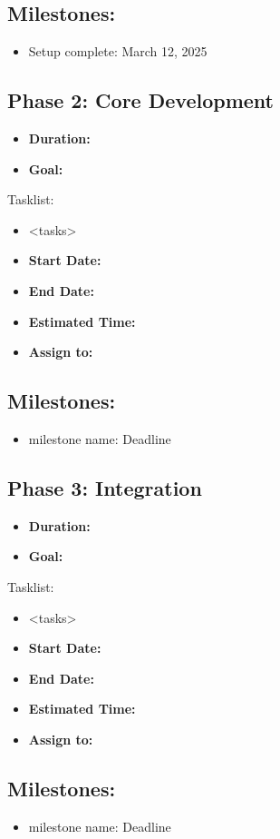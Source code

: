 \documentclass{report}
\begin{document}
\subsection*{Milestones:}
\begin{itemize}
    \item Setup complete: March 12, 2025
\end{itemize}
\subsection*{Phase 2: Core Development}
\begin{itemize}
    \item \textbf{Duration:} 
    \item \textbf{Goal:} 
\end{itemize}
Tasklist:
\begin{itemize}
    \item <tasks>
    \item \textbf{Start Date:} 
    \item \textbf{End Date:}
    \item \textbf{Estimated Time:}
    \item \textbf{Assign to:}
\end{itemize}
\subsection*{Milestones:}
\begin{itemize}
    \item milestone name: Deadline
\end{itemize}
\subsection*{Phase 3: Integration}
\begin{itemize}
    \item \textbf{Duration:} 
    \item \textbf{Goal:} 
\end{itemize}
Tasklist:
\begin{itemize}
    \item <tasks>
    \item \textbf{Start Date:} 
    \item \textbf{End Date:}
    \item \textbf{Estimated Time:}
    \item \textbf{Assign to:}
\end{itemize}
\subsection*{Milestones:}
\begin{itemize}
    \item milestone name: Deadline
\end{itemize}
\end{document}
